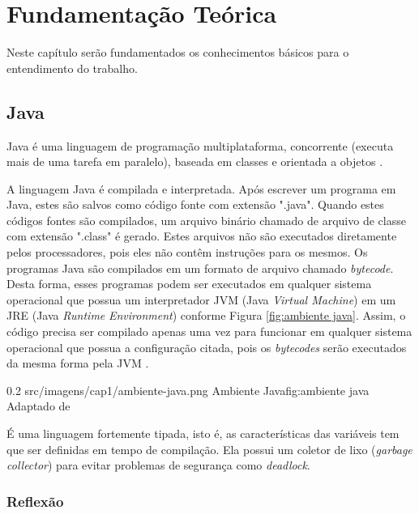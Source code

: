 \chapter{Fundamentação Teórica}
\label{ch:fundamentacao}
\par Neste capítulo ser\~ao fundamentados os conhecimentos b\'asicos para o entendimento do trabalho.

\section{Java}

\par Java é uma linguagem de programação multiplataforma, concorrente (executa mais de uma tarefa em paralelo), baseada em classes e orientada a objetos \cite{joy2000java}.
\par A linguagem Java é compilada e interpretada. Após escrever um programa em Java, estes são salvos como código fonte com extensão ".java". Quando estes códigos fontes são compilados, um arquivo binário chamado de arquivo de classe com extensão ".class" é gerado. Estes arquivos não são executados diretamente pelos processadores, pois eles não contêm instruções para os mesmos. Os programas Java são compilados em um formato de arquivo chamado \textit{bytecode}. Desta forma, esses programas podem ser executados em qualquer sistema operacional que possua um interpretador JVM (Java \textit{Virtual Machine}) em um JRE (Java \textit{Runtime} \textit{Environment}) conforme Figura \ref{fig:ambiente java}. Assim, o código precisa ser compilado apenas uma vez para funcionar em qualquer sistema operacional que possua a configuração citada, pois os \textit{bytecodes} serão executados da mesma forma pela JVM \cite{arnold2005java}.

\begin{image}
{0.2}
{src/imagens/cap1/ambiente-java.png}
{Ambiente Java}{fig:ambiente java}
{Adaptado de }
\end{image}

\par É uma linguagem fortemente tipada, isto é, as características das variáveis tem que ser definidas em tempo de compilação. Ela possui um coletor de lixo (\textit{garbage collector}) para evitar problemas de segurança como \textit{deadlock}. \cite{joy2000java}

\subsection{Reflexão}


